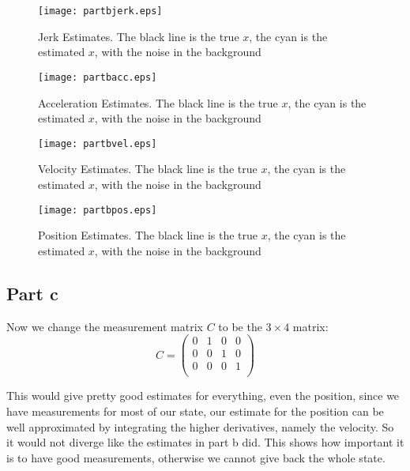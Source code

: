 \documentclass[11pt,english]{article}
\begin{document}
\begin{figure}[H]
  \centering
  \texttt{[image: partbjerk.eps]}
  \caption{Jerk Estimates. The black line is the true $x$, the cyan is the estimated $x$, with the noise in the background}
\end{figure}

\begin{figure}[H]
  \centering
  \texttt{[image: partbacc.eps]}
  \caption{Acceleration Estimates. The black line is the true $x$, the cyan is the estimated $x$, with the noise in the background}
\end{figure}

\begin{figure}[H]
  \centering
  \texttt{[image: partbvel.eps]}
  \caption{Velocity Estimates. The black line is the true $x$, the cyan is the estimated $x$, with the noise in the background}
\end{figure}

\begin{figure}[H]
  \centering
  \texttt{[image: partbpos.eps]}
  \caption{Position Estimates. The black line is the true $x$, the cyan is the estimated $x$, with the noise in the background}
\end{figure}


\subsection{Part c}
Now we change the measurement matrix $C$ to be the $3 \times 4$ matrix:
\[
C = \begin{pmatrix}
	0 & 1 & 0 & 0 \\
	0 & 0 & 1 & 0 \\
	0 & 0 & 0 & 1 \\
\end{pmatrix}
\]

This would give pretty good estimates for everything, even the position, since we have measurements for most of
our state, our estimate for the position can be well approximated by integrating the higher derivatives, namely
the velocity. So it would not diverge like the estimates in part b did. This shows how important it is to have
good measurements, otherwise we cannot give back the whole state. 
\end{document}
